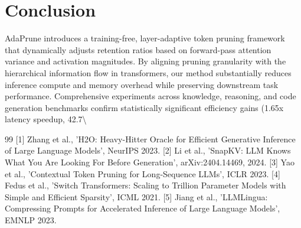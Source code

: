 \documentclass[11pt,a4paper]{article}
\begin{document}
\section{Conclusion}
AdaPrune introduces a training-free, layer-adaptive token pruning framework that dynamically adjusts retention ratios based on forward-pass attention variance and activation magnitudes. By aligning pruning granularity with the hierarchical information flow in transformers, our method substantially reduces inference compute and memory overhead while preserving downstream task performance. Comprehensive experiments across knowledge, reasoning, and code generation benchmarks confirm statistically significant efficiency gains (1.65x latency speedup, 42.7\textbackslash{}%


\begin{thebibliography}{99}
 [1] Zhang et al., 'H2O: Heavy-Hitter Oracle for Efficient Generative Inference of Large Language Models', NeurIPS 2023.
 [2] Li et al., 'SnapKV: LLM Knows What You Are Looking For Before Generation', arXiv:2404.14469, 2024.
 [3] Yao et al., 'Contextual Token Pruning for Long-Sequence LLMs', ICLR 2023.
 [4] Fedus et al., 'Switch Transformers: Scaling to Trillion Parameter Models with Simple and Efficient Sparsity', ICML 2021.
 [5] Jiang et al., 'LLMLingua: Compressing Prompts for Accelerated Inference of Large Language Models', EMNLP 2023.
\end{thebibliography}
\end{document}
